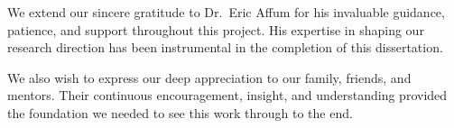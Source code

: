 
\begin{acknowledgements}

We extend our sincere gratitude to Dr.\ Eric Affum for his invaluable guidance, patience, and support throughout this project. His expertise in shaping our research direction has been instrumental in the completion of this dissertation.

We also wish to express our deep appreciation to our family, friends, and mentors. Their continuous encouragement, insight, and understanding provided the foundation we needed to see this work through to the end.

\end{acknowledgements}

